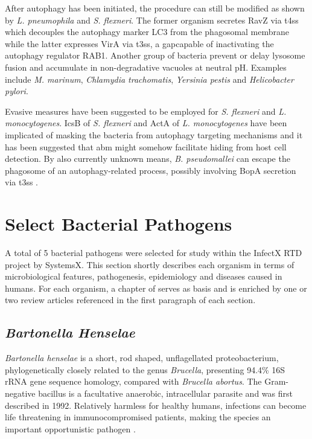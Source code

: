 After autophagy has been initiated, the procedure can still be modified as shown by \textit{L. pneumophila} and \textit{S. flexneri}. The former organism secretes RavZ via \gls{t4ss} which decouples the autophagy marker LC3 from the phagosomal membrane while the latter expresses VirA via \gls{t3ss}, a \gls{gap}capable of inactivating the autophagy regulator RAB1. Another group of bacteria prevent or delay lysosome fusion and accumulate in non-degradative vacuoles at neutral pH. Examples include \textit{M. marinum}, \textit{Chlamydia trachomatis}, \textit{Yersinia pestis} and \textit{Helicobacter pylori}.

Evasive measures have been suggested to be employed for \textit{S. flexneri} and \textit{L. monocytogenes}. IcsB of \textit{S. flexneri} and ActA of \textit{L. monocytogenes} have been implicated of masking the bacteria from autophagy targeting mechanisms and it has been suggested that \gls{abm} might somehow facilitate hiding from host cell detection. By also currently unknown means, \textit{B. pseudomallei} can escape the phagosome of an autophagy-related process, possibly involving BopA secretion via \gls{t3ss} \citep{Huang2014}.

\section{Select Bacterial Pathogens}

A total of 5 bacterial pathogens were selected for study within the InfectX RTD project by SystemsX. This section shortly describes each organism in terms of microbiological features, pathogenesis, epidemiology and diseases caused in humans. For each organism, a chapter of \cite{Rolain2006} serves as basis and is enriched by one or two review articles referenced in the first paragraph of each section.

\subsection{\textit{Bartonella Henselae}}

\textit{Bartonella henselae} is a short, rod shaped, unflagellated proteobacterium, phylogenetically closely related to the genus \textit{Brucella}, presenting 94.4\% 16S rRNA gene sequence homology, compared with \textit{Brucella abortus}. The Gram-negative bacillus is a facultative anaerobic, intracellular parasite and was first described in 1992. Relatively harmless for healthy humans, infections can become life threatening in immunocompromised patients, making the species an important opportunistic pathogen \citep{Anderson1997,Harms2012}.

